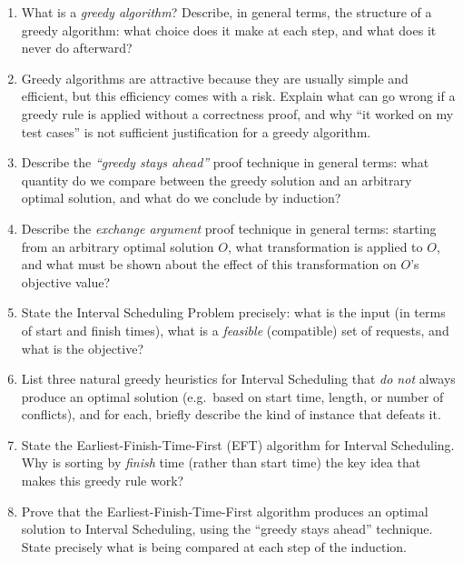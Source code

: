 \documentclass[11pt]{article}
\begin{document}
\begin{enumerate}[label=\textbf{A\arabic*.}, leftmargin=2.2em]

\item What is a \emph{greedy algorithm}? Describe, in general terms, the structure of a
greedy algorithm: what choice does it make at each step, and what does it never do
afterward?

\item Greedy algorithms are attractive because they are usually simple and efficient, but
this efficiency comes with a risk. Explain what can go wrong if a greedy rule is applied
without a correctness proof, and why ``it worked on my test cases'' is not sufficient
justification for a greedy algorithm.

\item Describe the \emph{``greedy stays ahead''} proof technique in general terms: what
quantity do we compare between the greedy solution and an arbitrary optimal solution, and
what do we conclude by induction?

\item Describe the \emph{exchange argument} proof technique in general terms: starting
from an arbitrary optimal solution $O$, what transformation is applied to $O$, and what
must be shown about the effect of this transformation on $O$'s objective value?

\item State the Interval Scheduling Problem precisely: what is the input (in terms of
start and finish times), what is a \emph{feasible} (compatible) set of requests, and what
is the objective?

\item List three natural greedy heuristics for Interval Scheduling that \emph{do not}
always produce an optimal solution (e.g.\ based on start time, length, or number of
conflicts), and for each, briefly describe the kind of instance that defeats it.

\item State the Earliest-Finish-Time-First (EFT) algorithm for Interval Scheduling.
Why is sorting by \emph{finish} time (rather than start time) the key idea that makes
this greedy rule work?

\item Prove that the Earliest-Finish-Time-First algorithm produces an optimal solution to
Interval Scheduling, using the ``greedy stays ahead'' technique. State precisely what is
being compared at each step of the induction.


\end{enumerate}
\end{document}
